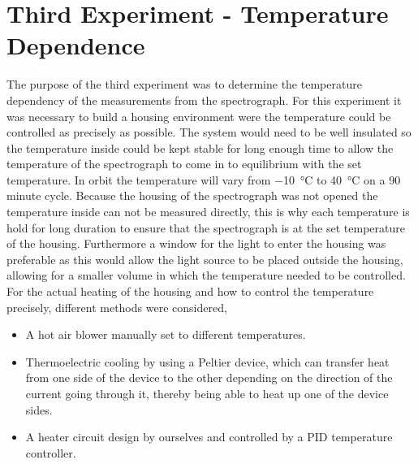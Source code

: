 \section{Third Experiment - Temperature Dependence}
The purpose of the third experiment was to determine the temperature dependency of the measurements from the spectrograph. For this experiment it was necessary to build a housing environment were  the temperature could be controlled as precisely as possible. The system would need to be well insulated so the temperature inside could be kept stable for long enough time to allow the temperature of the spectrograph to come in to equilibrium with the set temperature. In orbit the temperature will vary from \SI{-10}{\degreeCelsius} to \SI{40}{\degreeCelsius} on a 90 minute cycle. Because the housing of the spectrograph was not opened the temperature inside can not be measured directly, this is why each temperature is hold for long duration to ensure that the spectrograph is at the set temperature of the housing. Furthermore a window for the light to enter the housing was preferable as this would allow the light source to be placed outside the housing, allowing for a smaller volume in which the temperature needed to be controlled. For the actual heating of the housing and how to control the temperature precisely, different methods were considered,

\begin{itemize}
\item A hot air blower manually set to different temperatures.
\item Thermoelectric cooling by using a Peltier device, which can transfer heat from one side of the device to the other depending on the direction of the current going through it, thereby being able to heat up one of the device sides. 
\item A heater circuit design by ourselves and controlled by a PID temperature controller.
\end{itemize}

